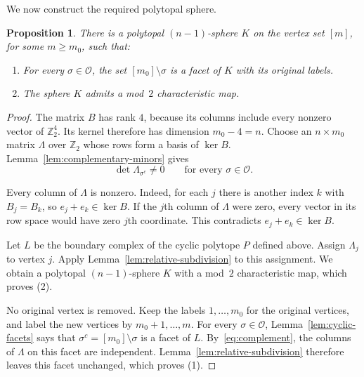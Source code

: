 \documentclass{amsart}
\theoremstyle{plain}
\newtheorem{proposition}[theorem]{Proposition}
\numberwithin{equation}{section}
\theoremstyle{remark}
\theoremstyle{definition}
\newcommand{\Z}{\mathbb Z}
\newcommand{\cO}{\mathcal O}
\begin{document}
We now construct the required polytopal sphere.
\begin{proposition}\label{prop:polytope}
    There is a polytopal $(n-1)$-sphere $K$ on the vertex set $[m]$, for some $m\ge m_0$, such that:
    \begin{enumerate}
        \item For every $\sigma\in\cO$, the set $[m_0]\setminus\sigma$ is a facet of $K$ with its original labels.
        \item The sphere $K$ admits a mod~$2$ characteristic map.
    \end{enumerate}
\end{proposition}
\begin{proof}
    The matrix $B$ has rank $4$, because its columns include every nonzero vector of $\Z_2^4$.
    Its kernel therefore has dimension $m_0-4=n$.
    Choose an $n\times m_0$ matrix $\Lambda$ over $\Z_2$ whose rows form a basis of $\ker B$.
    Lemma~\ref{lem:complementary-minors} gives 
    \begin{equation}\label{eq:complement}
        \det\Lambda_{\sigma^c}\ne0     \qquad\text{for every }\sigma\in\cO.
    \end{equation}
    
    Every column of $\Lambda$ is nonzero.
    Indeed, for each $j$ there is another index $k$ with $B_j=B_k$, so $e_j+e_k\in\ker B$.
    If the $j$th column of $\Lambda$ were zero, every vector in its row space would have zero $j$th coordinate.
    This contradicts $e_j+e_k\in\ker B$.
    
    Let $L$ be the boundary complex of the cyclic polytope $P$ defined above.
    Assign $\Lambda_j$ to vertex $j$.
    Apply Lemma~\ref{lem:relative-subdivision} to this assignment.
    We obtain a polytopal $(n-1)$-sphere $K$ with a mod~$2$ characteristic map, which proves (2).

    No original vertex is removed.
    Keep the labels $1,\ldots,m_0$ for the original vertices, and label the new vertices by $m_0+1,\ldots,m$.
    For every $\sigma \in \cO$, Lemma~\ref{lem:cyclic-facets} says that $\sigma^c = [m_0] \setminus \sigma$ is a facet of $L$.
    By~\eqref{eq:complement}, the columns of $\Lambda$ on this facet are independent.
    Lemma~\ref{lem:relative-subdivision} therefore leaves this facet unchanged, which proves (1).
\end{proof}
\end{document}
